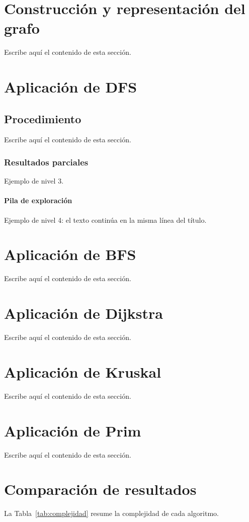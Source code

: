 \documentclass[11pt,letterpaper]{article}
\begin{document}
\section{Construcción y representación del grafo}
Escribe aquí el contenido de esta sección.

\section{Aplicación de DFS}
\subsection{Procedimiento}
Escribe aquí el contenido de esta sección.
\subsubsection{Resultados parciales}
Ejemplo de nivel 3.
\paragraph{Pila de exploración}
Ejemplo de nivel 4: el texto continúa en la misma línea del título.

\section{Aplicación de BFS}
Escribe aquí el contenido de esta sección.

\section{Aplicación de Dijkstra}
Escribe aquí el contenido de esta sección.

\section{Aplicación de Kruskal}
Escribe aquí el contenido de esta sección.

\section{Aplicación de Prim}
Escribe aquí el contenido de esta sección.

\section{Comparación de resultados}
La Tabla~\ref{tab:complejidad} resume la complejidad de cada algoritmo.
\end{document}
